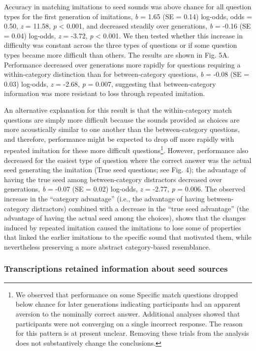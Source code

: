 \documentclass[english,floatsintext,man]{apa6}
\theoremstyle{definition}
\theoremstyle{definition}
\theoremstyle{remark}
\begin{document}
Accuracy in matching imitations to seed sounds was above chance for all
question types for the first generation of imitations, \emph{b} = 1.65
(SE = 0.14) log-odds, odds = 0.50, \emph{z} = 11.58, \emph{p}
\textless{} 0.001, and decreased steadily over generations, \emph{b} =
-0.16 (SE = 0.04) log-odds, \emph{z} = -3.72, \emph{p} \textless{}
0.001. We then tested whether this increase in difficulty was constant
across the three types of questions or if some question types became
more difficult than others. The results are shown in Fig. 5A.
Performance decreased over generations more rapidly for questions
requiring a within-category distinction than for between-category
questions, \emph{b} = -0.08 (SE = 0.03) log-odds, \emph{z} = -2.68,
\emph{p} = 0.007, suggesting that between-category information was more
resistant to loss through repeated imitation.

An alternative explanation for this result is that the within-category
match questions are simply more difficult because the sounds provided as
choices are more acoustically similar to one another than the
between-category questions, and therefore, performance might be expected
to drop off more rapidly with repeated imitation for these more
difficult questions\footnote{We observed that performance on some
  Specific match questions dropped below chance for later generations
  indicating participants had an apparent aversion to the nominally
  correct answer. Additional analyses showed that participants were not
  converging on a single incorrect response. The reason for this pattern
  is at present unclear. Removing these trials from the analysis does
  not substantively change the conclusions.}. However, performance also
decreased for the easiest type of question where the correct answer was
the actual seed generating the imitation (True seed questions; see Fig.
4); the advantage of having the true seed among between-category
distractors decreased over generations, \emph{b} = -0.07 (SE = 0.02)
log-odds, \emph{z} = -2.77, \emph{p} = 0.006. The observed increase in
the \enquote{category advantage} (i.e., the advantage of having
between-category distractors) combined with a decrease in the
\enquote{true seed advantage} (the advantage of having the actual seed
among the choices), shows that the changes induced by repeated imitation
caused the imitations to lose some of properties that linked the earlier
imitations to the specific sound that motivated them, while nevertheless
preserving a more abstract category-based resemblance.

\subsubsection{Transcriptions retained information about seed
sources}\label{transcriptions-retained-information-about-seed-sources}
\end{document}
